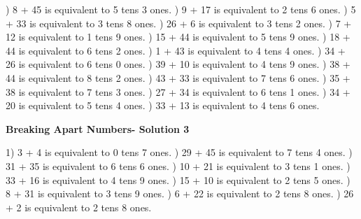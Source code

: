 \documentclass{article}%
\begin{document}
) 8 + 45 is equivalent to 5 tens 3 ones.%
) 9 + 17 is equivalent to 2 tens 6 ones.%
) 5 + 33 is equivalent to 3 tens 8 ones.%
) 26 + 6 is equivalent to 3 tens 2 ones.%
) 7 + 12 is equivalent to 1 tens 9 ones.%
) 15 + 44 is equivalent to 5 tens 9 ones.%
) 18 + 44 is equivalent to 6 tens 2 ones.%
) 1 + 43 is equivalent to 4 tens 4 ones.%
) 34 + 26 is equivalent to 6 tens 0 ones.%
) 39 + 10 is equivalent to 4 tens 9 ones.%
) 38 + 44 is equivalent to 8 tens 2 ones.%
) 43 + 33 is equivalent to 7 tens 6 ones.%
) 35 + 38 is equivalent to 7 tens 3 ones.%
) 27 + 34 is equivalent to 6 tens 1 ones.%
) 34 + 20 is equivalent to 5 tens 4 ones.%
) 33 + 13 is equivalent to 4 tens 6 ones.%
\newline%
\newpage%
\large%
\begin{center}%
\textbf{Breaking Apart Numbers- Solution 3}%
\newline%
\end{center} \normalsize%
1) 3 + 4 is equivalent to 0 tens 7 ones.%
) 29 + 45 is equivalent to 7 tens 4 ones.%
) 31 + 35 is equivalent to 6 tens 6 ones.%
) 10 + 21 is equivalent to 3 tens 1 ones.%
) 33 + 16 is equivalent to 4 tens 9 ones.%
) 15 + 10 is equivalent to 2 tens 5 ones.%
) 8 + 31 is equivalent to 3 tens 9 ones.%
) 6 + 22 is equivalent to 2 tens 8 ones.%
) 26 + 2 is equivalent to 2 tens 8 ones.%
\newline%
\end{document}

